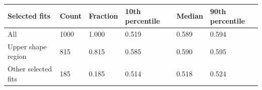 \begin{tabular}{llllll}
\toprule
Selected fits & Count & Fraction & 10th percentile & Median & 90th percentile \\
\midrule
All & 1000 & 1.000 & 0.519 & 0.589 & 0.594 \\
Upper shape region & 815 & 0.815 & 0.585 & 0.590 & 0.595 \\
Other selected fits & 185 & 0.185 & 0.514 & 0.518 & 0.524 \\
\bottomrule
\end{tabular}
